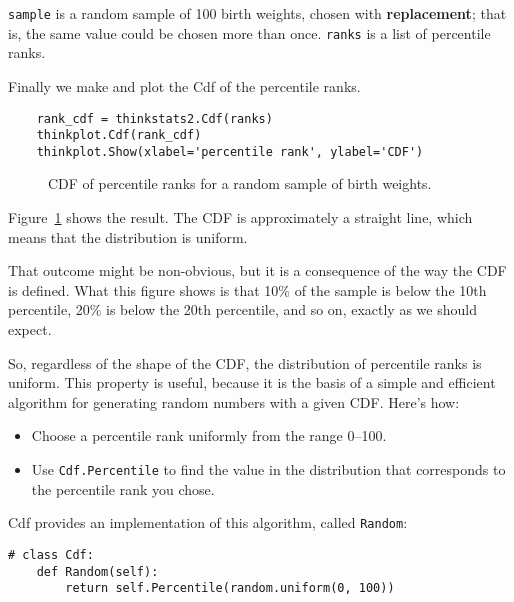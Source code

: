 {\tt sample}
is a random sample of 100 birth weights, chosen with {\bf replacement};
that is, the same value could be chosen more than once.  {\tt ranks}
is a list of percentile ranks.

Finally we make and plot the Cdf of the percentile ranks.

\begin{verbatim}
    rank_cdf = thinkstats2.Cdf(ranks)
    thinkplot.Cdf(rank_cdf)
    thinkplot.Show(xlabel='percentile rank', ylabel='CDF')
\end{verbatim}

\begin{figure}
\caption{CDF of percentile ranks for a random sample of birth weights.}
\label{cumulative_random}
\end{figure}

Figure~\ref{cumulative_random} shows the result.  The CDF is
approximately a straight line, which means that the distribution
is uniform.

That outcome might be non-obvious, but it is a consequence of
the way the CDF is defined.  What this figure shows is that 10\%
of the sample is below the 10th percentile, 20\% is below the
20th percentile, and so on, exactly as we should expect.

So, regardless of the shape of the CDF, the distribution of
percentile ranks is uniform.  This property is useful, because it
is the basis of a simple and efficient algorithm for generating
random numbers with a given CDF.  Here's how:

\begin{itemize}

\item Choose a percentile rank uniformly from the range 0--100.

\item Use {\tt Cdf.Percentile} to find the value in the distribution
that corresponds to the percentile rank you chose.

\end{itemize}

Cdf provides an implementation of this algorithm, called
{\tt Random}:

\begin{verbatim}
# class Cdf:
    def Random(self):
        return self.Percentile(random.uniform(0, 100))
\end{verbatim}

